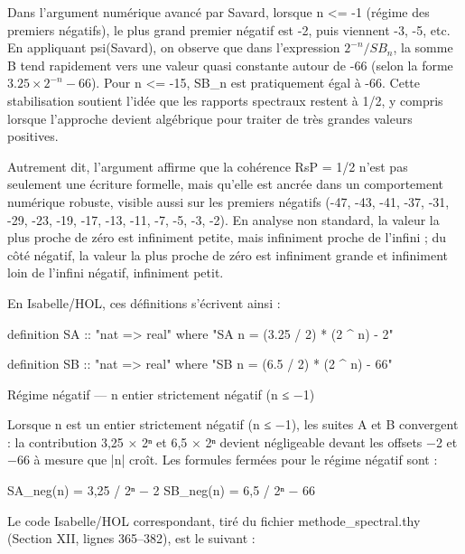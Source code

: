 \documentclass[11pt,a4paper]{article}
\begin{document}
Dans l'argument numérique avancé par Savard, lorsque n <= -1 (régime des premiers négatifs), le plus grand premier négatif est -2, puis viennent -3, -5, etc. En appliquant psi(Savard), on observe que dans l'expression $2^{-n}/SB_n$, la somme B tend rapidement vers une valeur quasi constante autour de -66 (selon la forme $3.25 \times 2^{-n} - 66$). Pour n <= -15, SB_n est pratiquement égal à -66. Cette stabilisation soutient l'idée que les rapports spectraux restent à 1/2, y compris lorsque l'approche devient algébrique pour traiter de très grandes valeurs positives.

Autrement dit, l'argument affirme que la cohérence RsP = 1/2 n'est pas seulement une écriture formelle, mais qu'elle est ancrée dans un comportement numérique robuste, visible aussi sur les premiers négatifs (-47, -43, -41, -37, -31, -29, -23, -19, -17, -13, -11, -7, -5, -3, -2). En analyse non standard, la valeur la plus proche de zéro est infiniment petite, mais infiniment proche de l'infini ; du côté négatif, la valeur la plus proche de zéro est infiniment grande et infiniment loin de l'infini négatif, infiniment petit.

En Isabelle/HOL, ces définitions s'écrivent ainsi :

\begin{holcode}[title={Code HOL — Régime positif (n ≥ 1)}]
definition SA :: "nat => real" where
 "SA n = (3.25 / 2) * (2 \textasciicircum{} n) - 2"

definition SB :: "nat => real" where
 "SB n = (6.5 / 2) * (2 \textasciicircum{} n) - 66"
\end{holcode}

Régime négatif — n entier strictement négatif (n ≤ −1)

Lorsque n est un entier strictement négatif (n ≤ −1), les suites A et B convergent : la contribution 3,25 × 2ⁿ et 6,5 × 2ⁿ devient négligeable devant les offsets −2 et −66 à mesure que |n| croît. Les formules fermées pour le régime négatif sont :

SA\_neg(n) = 3,25 / 2ⁿ − 2
 SB\_neg(n) = 6,5 / 2ⁿ − 66

Le code Isabelle/HOL correspondant, tiré du fichier methode\_spectral.thy (Section XII, lignes 365–382), est le suivant :
\end{document}
